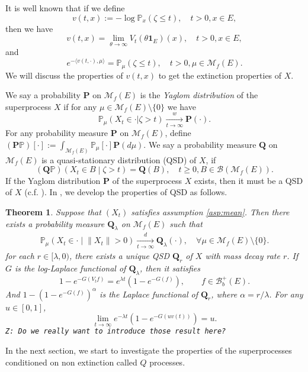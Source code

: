 \documentclass[12pt,a4paper]{amsart}
\numberwithin{equation}{section}
\theoremstyle{plain}
\newtheorem{thm}{Theorem}[section]
\theoremstyle{definition}
\theoremstyle{remark}
\begin{document}
{\color{gray}
It is well known that if we define
\[
	v(t,x):= -\log \mathbb P_x(\zeta \leq t), \quad t > 0, x\in E,
\]
then we have
\[
	v(t,x)
	= \lim_{\theta \to \infty} V_t(\theta \mathbf 1_E)(x),
	\quad t>0, x\in E,
\]
	and
\begin{equation}
\label{eq: v and extinction}
	e^{-\langle v(t,\cdot), \mu \rangle}
	= \mathbb P_\mu(\zeta \leq t), \quad t>0, \mu \in \mathcal M_f(E).
\end{equation}
We will discuss the properties of $v(t,x)$ to get the extinction properties of $X$.
}
{\color{gray}
We say a probability ${\mathbf P}$ on $\mathcal M_f(E)$ is the \emph{Yaglom distribution} of the superprocess $X$ if for any $\mu\in \mathcal M_f(E)\setminus\{0\}$ we have
\[
  \mathbb P_\mu(X_t \in \cdot | \zeta > t) \xrightarrow[t\to \infty]{w} {\mathbf P}(\cdot).
\]
For any probability measure $\mathbf P$ on $\mathcal M_f(E)$, define $(\mathbf P\mathbb P)[\cdot] := \int_{\mathcal M_f(E)} \mathbb P_\mu[\cdot] \mathbf P(d\mu)$.  We say a probability measure $\mathbf Q$ on $\mathcal M_f(E)$ is a quasi-stationary distribution (QSD) of $X$, if
	\[
	(\mathbf Q \mathbb P) \left( X_t \in B \middle | \zeta>t \right) = \mathbf Q(B), \quad t\geq 0, B \in \mathcal B(\mathcal M_f(E)).
	\]
If the Yaglom distribution ${\mathbf P}$ of the superprocess $X$ exists, then it must be a QSD of $X$ (c.f. \cite{MeleardVillemonais2012Quasi-stationary}).
In \cite{LSRS}, we develop the properties of QSD as follows.
\begin{thm} \label{Yaglom}
	Suppose that $(X_t)$ satisfies assumption \ref{asp:mean}.	Then there exists a probability measure $\mathbf Q_\lambda$ on $\mathcal M_f(E)$ such that
\begin{align}
 	\mathbb P_\mu \left(X_t \in \cdot \middle| \|X_t\| > 0 \right)
 	\xrightarrow[t\to \infty]{d} \mathbf Q_\lambda(\cdot),
 	\quad \forall \mu \in \mathcal M_f(E)\setminus \{0\}.
\end{align}
for each $r \in [\lambda, 0)$, there exists a unique QSD $\mathbf Q_r$ of $X$ with mass decay rate $r$. If $G$ is the log-Laplace functional of $\mathbf Q_\lambda$, then it satisfies
\begin{equation}\label{ll}
1-e^{-G(V_tf)}=e^{\lambda t}(1-e^{-G(f)}), \qquad f\in\mathcal B_b^+(E).
\end{equation}
And $1-\left(1-e^{-G(f)}\right)^\alpha$ is the Laplace functional of $\mathbf Q_r$, where $\alpha=r/\lambda$.  For any $u\in [0,1]$,
\begin{equation}\label{tail of L}
\lim_{t\to\infty}e^{-\lambda t}\left(1-e^{-G(uv(t))}\right)=u.
\end{equation}
	{\tt Z: Do we really want to introduce those result here?}
\end{thm}
In the next section, we start to investigate the properties of the superprocesses conditioned on non extinction called $Q$ processes.
}
\end{document}
